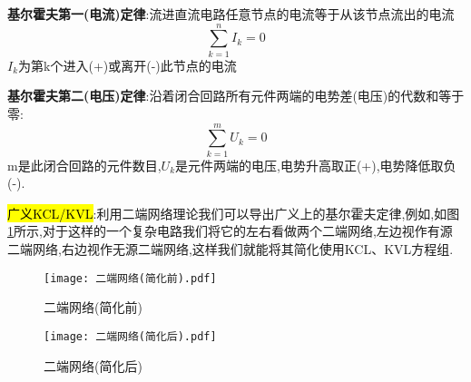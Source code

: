 \begin{theorem}[基尔霍夫定律]
    \textbf{基尔霍夫第一(电流)定律}:流进直流电路任意节点的电流等于从该节点流出的电流
    \begin{equation}
        \sum_{k=1}^n{I_k}=0
    \end{equation}
    $I_k$为第k个进入(+)或离开(-)此节点的电流

    \textbf{基尔霍夫第二(电压)定律}:沿着闭合回路所有元件两端的电势差(电压)的代数和等于零:
    \begin{equation}
        \sum_{k=1}^m{U_k}=0
    \end{equation}
    m是此闭合回路的元件数目,$U_k$是元件两端的电压,电势升高取正(+),电势降低取负(-).
\end{theorem}
\hl{广义KCL/KVL}:利用二端网络理论我们可以导出广义上的基尔霍夫定律,例如,如图\ref{fig:二端网络(简化后)}所示,对于这样的一个复杂电路我们将它的左右看做两个二端网络,左边视作有源二端网络,右边视作无源二端网络,这样我们就能将其简化使用KCL、KVL方程组.
\begin{figure}[htbp]
    \centering
    \begin{minipage}{0.48\textwidth}
        \centering
        \texttt{[image: 二端网络(简化前).pdf]}
    \caption{二端网络(简化前)}
    \end{minipage}
    \begin{minipage}{0.48\textwidth}
        \centering
        \texttt{[image: 二端网络(简化后).pdf]}
    \caption{二端网络(简化后)}
    \label{fig:二端网络(简化后)}
    \end{minipage}
\end{figure}


